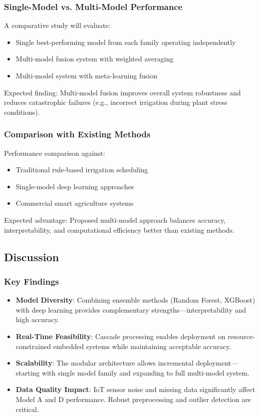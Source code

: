 \documentclass[conference]{IEEEtran}
\begin{document}
\subsubsection{Single-Model vs. Multi-Model Performance}

A comparative study will evaluate:
\begin{itemize}
\item Single best-performing model from each family operating independently
\item Multi-model fusion system with weighted averaging
\item Multi-model system with meta-learning fusion
\end{itemize}

Expected finding: Multi-model fusion improves overall system robustness and reduces catastrophic failures (e.g., incorrect irrigation during plant stress conditions).

\subsubsection{Comparison with Existing Methods}

Performance comparison against:
\begin{itemize}
\item Traditional rule-based irrigation scheduling
\item Single-model deep learning approaches
\item Commercial smart agriculture systems
\end{itemize}

Expected advantage: Proposed multi-model approach balances accuracy, interpretability, and computational efficiency better than existing methods.

\subsection{Discussion}

\subsubsection{Key Findings}

\begin{itemize}
\item \textbf{Model Diversity}: Combining ensemble methods (Random Forest, XGBoost) with deep learning provides complementary strengths—interpretability and high accuracy.

\item \textbf{Real-Time Feasibility}: Cascade processing enables deployment on resource-constrained embedded systems while maintaining acceptable accuracy.

\item \textbf{Scalability}: The modular architecture allows incremental deployment—starting with single model family and expanding to full multi-model system.

\item \textbf{Data Quality Impact}: IoT sensor noise and missing data significantly affect Model A and D performance. Robust preprocessing and outlier detection are critical.
\end{itemize}
\end{document}
